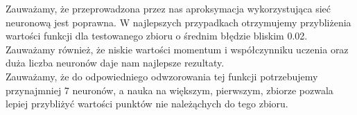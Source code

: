 \documentclass[12pt]{article}
\begin{document}
Zauważamy, że przeprowadzona przez nas aproksymacja wykorzystująca sieć neuronową jest poprawna. W najlepszych przypadkach otrzymujemy przybliżenia wartości funkcji dla testowanego zbioru o średnim błędzie bliskim 0.02. \\ Zauważamy również, że niskie wartości momentum i współczynniku uczenia oraz duża liczba neuronów daje nam najlepsze rezultaty.\\ Zauważamy, że do odpowiedniego odwzorowania tej funkcji potrzebujemy przynajmniej 7 neuronów, a nauka na większym, pierwszym, zbiorze pozwala lepiej przybliżyć wartości punktów nie należąchych do tego zbioru.






\renewcommand\refname{Bibliografia}


\end{document}
